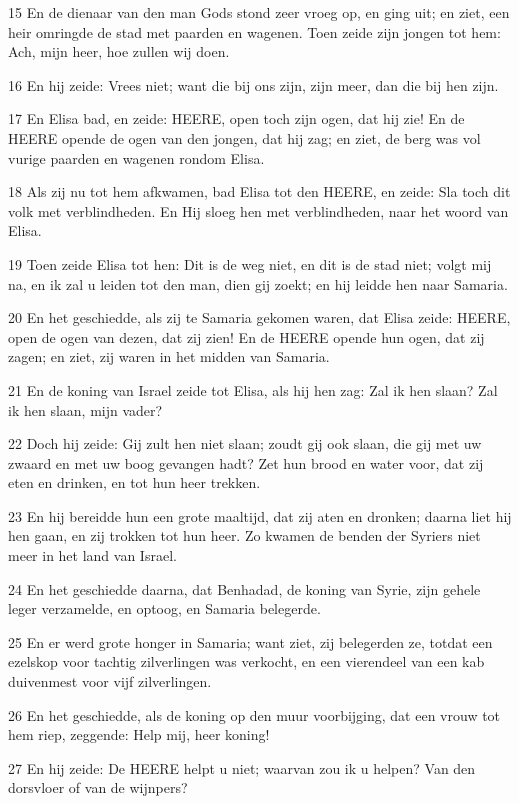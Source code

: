 \par 15 En de dienaar van den man Gods stond zeer vroeg op, en ging uit; en ziet, een heir omringde de stad met paarden en wagenen. Toen zeide zijn jongen tot hem: Ach, mijn heer, hoe zullen wij doen.
\par 16 En hij zeide: Vrees niet; want die bij ons zijn, zijn meer, dan die bij hen zijn.
\par 17 En Elisa bad, en zeide: HEERE, open toch zijn ogen, dat hij zie! En de HEERE opende de ogen van den jongen, dat hij zag; en ziet, de berg was vol vurige paarden en wagenen rondom Elisa.
\par 18 Als zij nu tot hem afkwamen, bad Elisa tot den HEERE, en zeide: Sla toch dit volk met verblindheden. En Hij sloeg hen met verblindheden, naar het woord van Elisa.
\par 19 Toen zeide Elisa tot hen: Dit is de weg niet, en dit is de stad niet; volgt mij na, en ik zal u leiden tot den man, dien gij zoekt; en hij leidde hen naar Samaria.
\par 20 En het geschiedde, als zij te Samaria gekomen waren, dat Elisa zeide: HEERE, open de ogen van dezen, dat zij zien! En de HEERE opende hun ogen, dat zij zagen; en ziet, zij waren in het midden van Samaria.
\par 21 En de koning van Israel zeide tot Elisa, als hij hen zag: Zal ik hen slaan? Zal ik hen slaan, mijn vader?
\par 22 Doch hij zeide: Gij zult hen niet slaan; zoudt gij ook slaan, die gij met uw zwaard en met uw boog gevangen hadt? Zet hun brood en water voor, dat zij eten en drinken, en tot hun heer trekken.
\par 23 En hij bereidde hun een grote maaltijd, dat zij aten en dronken; daarna liet hij hen gaan, en zij trokken tot hun heer. Zo kwamen de benden der Syriers niet meer in het land van Israel.
\par 24 En het geschiedde daarna, dat Benhadad, de koning van Syrie, zijn gehele leger verzamelde, en optoog, en Samaria belegerde.
\par 25 En er werd grote honger in Samaria; want ziet, zij belegerden ze, totdat een ezelskop voor tachtig zilverlingen was verkocht, en een vierendeel van een kab duivenmest voor vijf zilverlingen.
\par 26 En het geschiedde, als de koning op den muur voorbijging, dat een vrouw tot hem riep, zeggende: Help mij, heer koning!
\par 27 En hij zeide: De HEERE helpt u niet; waarvan zou ik u helpen? Van den dorsvloer of van de wijnpers?
